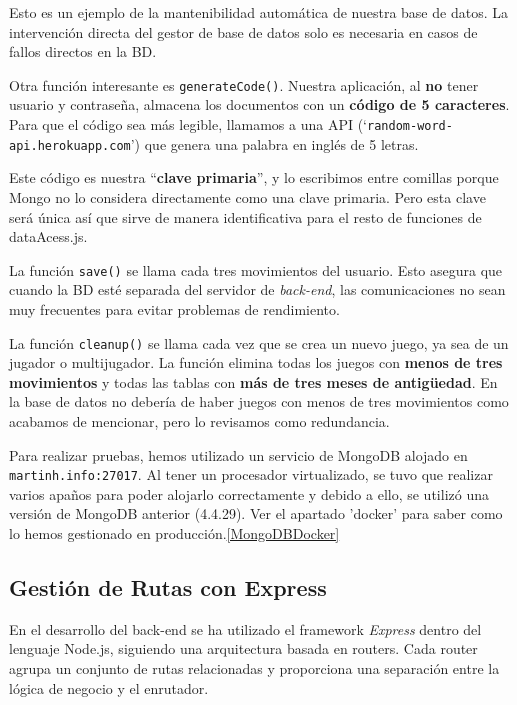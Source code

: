 \documentclass[12pt,epsf,titlepage,a4paper]{article}
\begin{document}
\begin{itemize}
Esto es un ejemplo de la mantenibilidad automática de nuestra base de datos. La intervención directa del gestor de base de datos solo es necesaria en casos de fallos directos en la BD.

Otra función interesante es \texttt{generateCode()}. Nuestra aplicación, al \textbf{no} tener usuario y contraseña, almacena los documentos con un \textbf{código de 5 caracteres}. Para que el código sea más legible, llamamos a una API (‘\texttt{random-word-api.herokuapp.com}’) que genera una palabra en inglés de 5 letras.

Este código es nuestra “\textbf{clave primaria}”, y lo escribimos entre comillas porque Mongo no lo considera directamente como una clave primaria. Pero esta clave será única así que sirve de manera identificativa para el resto de funciones de dataAcess.js.

La función \texttt{save()} se llama cada tres movimientos del usuario. Esto asegura que cuando la BD esté separada del servidor de \textit{back-end}, las comunicaciones no sean muy frecuentes para evitar problemas de rendimiento.

La función \texttt{cleanup()} se llama cada vez que se crea un nuevo juego, ya sea de un jugador o multijugador. La función elimina todas los juegos con \textbf{menos de tres movimientos} y todas las tablas con \textbf{más de tres meses de antigüedad}. En la base de datos no debería de haber juegos con menos de tres movimientos como acabamos de mencionar, pero lo revisamos como redundancia.

Para realizar pruebas, hemos utilizado un servicio de MongoDB alojado en \texttt{martinh.info:27017}. Al tener un procesador virtualizado, se tuvo que realizar varios apaños para poder alojarlo correctamente y debido a ello, se utilizó una versión de MongoDB anterior (4.4.29). Ver el apartado 'docker' para saber como lo hemos gestionado en producción.\ref{MongoDBDocker}

\end{itemize}

\subsection{Gestión de Rutas con Express}

En el desarrollo del back-end se ha utilizado el framework \emph{Express} dentro del lenguaje Node.js, siguiendo una arquitectura basada en routers. Cada router agrupa un conjunto de rutas relacionadas y proporciona una separación entre la lógica de negocio y el enrutador.
\end{document}

